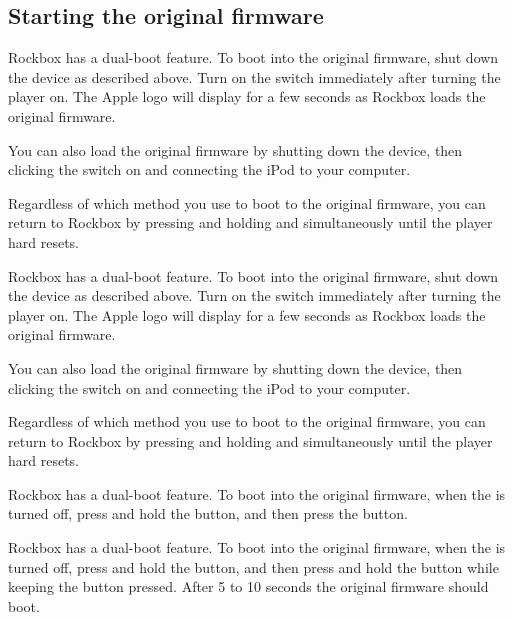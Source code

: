   {
  \subsection{Starting the original firmware}
  \label{ref:Dualboot}
    {
    Rockbox has a dual-boot feature. To boot into the original firmware, shut
    down the device as described above. Turn on the \ButtonHold{} switch
    immediately after turning the player on. The Apple logo will
    display for a few seconds as Rockbox loads the original firmware.

    You can also load the original firmware by shutting down the device,
    then clicking the \ButtonHold{} switch on and connecting the iPod
    to your computer.

    Regardless of which method you use to boot to the original firmware, you can
    return to Rockbox by pressing and holding \ButtonMenu{} and \ButtonSelect{}
    simultaneously until the player hard resets.
    }

    {
    Rockbox has a dual-boot feature. To boot into the original firmware, shut
    down the device as described above. Turn on the \ButtonHold{} switch
    immediately after turning the player on. The Apple logo will
    display for a few seconds as Rockbox loads the original firmware.

    You can also load the original firmware by shutting down the device,
    then clicking the \ButtonHold{} switch on and connecting the iPod
    to your computer.

    Regardless of which method you use to boot to the original firmware, you can
    return to Rockbox by pressing and holding \ButtonMenu{} and \ButtonPlay{}
    simultaneously until the player hard resets.
    }

    {
    Rockbox has a dual-boot feature. To boot into the original firmware,
    when the \dap{} is turned off, press and hold the \ButtonRec{} button,
    and then press the \ButtonOn{} button.
    }
    {
    Rockbox has a dual-boot feature. To boot into the original firmware,
    when the \dap{} is turned off, press and hold the \ButtonVolDown{} button,
    and then press and hold the \ButtonPower{} button while keeping the
    \ButtonVolDown{} button pressed. After 5 to 10 seconds the original
    firmware should boot.

}}
